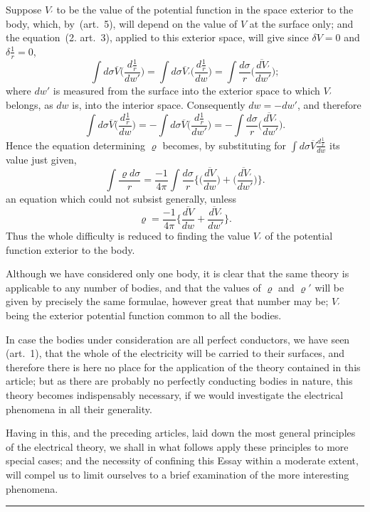 \documentclass[11pt,notitlepage]{amsart}
\def\Crule{\begin{center}\rule[.5ex]{5em}{.2pt}\\[10pt]\end{center}}
\renewcommand{\rho}{\varrho}
\begin{document}
Suppose $V_\prime$ to be the value of the potential function in the space 
exterior to the body, which, by~(art.~5), will depend
on the value of $V$ at the
surface only; and the equation~(2. art.~3), applied to this exterior space,
will give since ${\delta V=0}$ and ${\delta\frac1r=0}$,
\[
  \int d\sigma\overline{V}
  \biggl(\frac{d\frac1r}{dw'}\biggr)
  =\int d\sigma\overline{V}_\prime
  \biggl(\frac{d\frac1r}{dw}\biggr)
  =\int\frac{d\sigma}{r}
  \biggl(\frac{\overline{dV}_\prime}{dw'}\biggr);
\]
where $dw'$ is measured from the surface into the exterior space
to which $V_\prime$
belongs, as $dw$ is, into the interior space. Consequently ${dw=-dw'}$,
and therefore
\[
  \int d\sigma\overline{V}
  \biggl(\frac{d\frac1r}{dw}\biggr)
  =-\int d\sigma\overline{V}
  \biggl(\frac{d\frac1r}{dw'}\biggr)
  =-\int\frac{d\sigma}{r}
  \biggl(\frac{\overline{dV}_\prime}{dw'}\biggr).
\]
Hence the equation determining $\rho$ becomes,
by substituting for $\int d\sigma\overline{V}\frac{d\frac1r}{dw}$
its value just given,
\[
\int\frac{\rho d\sigma}{r}
=\frac{-1}{4\pi} \int\frac{d\sigma}{r}\biggl\{
  \biggl(\frac{\overline{dV}}{dw}\biggr)
  +\biggl(\frac{\overline{dV}_\prime}{dw'}\biggr)
\biggr\}.
\]
an equation which could not subsist generally, unless
\[
\tag{7.}
\rho=\frac{-1}{4\pi}\biggl\{
  \frac{\overline{dV}}{dw}+\frac{\overline{dV}_\prime}{dw'}
\biggr\}.
\]
Thus the whole difficulty is reduced to finding
the value $V_\prime$ of the potential
function exterior to the body.

Although we have considered only one body, it is clear that the same
theory is applicable to any number of bodies,
and that the values of $\rho$ and $\rho'$
will be given by precisely the same formulae, however great that number may
be; $V_\prime$ being the exterior potential function common to all the bodies.

In case the bodies under consideration are all perfect conductors, we
have seen (art.~1), that the whole of the electricity will be carried to their
surfaces, and therefore there is here no place for the application of the theory
contained in this article; but as there are probably no perfectly conducting
bodies in nature, this theory becomes indispensably necessary, if we would
investigate the electrical phenomena in all their generality.

Having in this, and the preceding articles, laid down the most general
principles of the electrical theory, we shall in what follows apply these 
principles to more special cases;
and the necessity of confining this Essay within
a moderate extent, will compel us to limit ourselves to a brief examination of
the more interesting phenomena.
\bigskip
\Crule
\end{document}
